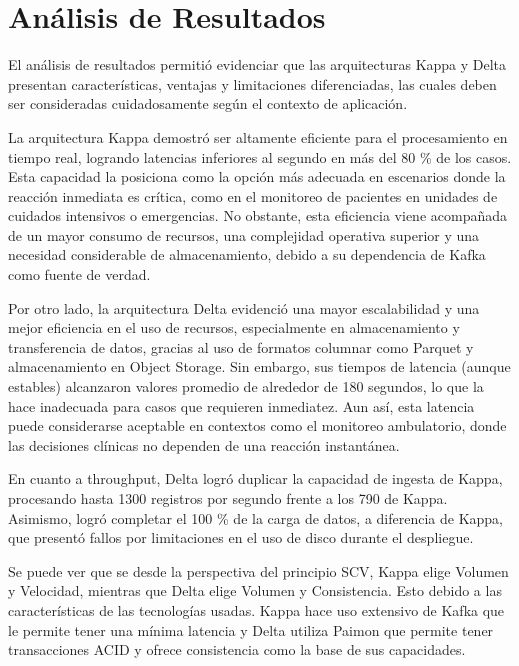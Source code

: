 \section{Análisis de Resultados}

El análisis de resultados permitió evidenciar que las arquitecturas Kappa y Delta presentan características, 
ventajas y limitaciones diferenciadas, las cuales deben ser consideradas cuidadosamente según el contexto de aplicación. \newline

La arquitectura Kappa demostró ser altamente eficiente para el procesamiento en tiempo real, logrando latencias inferiores al segundo en más del 80 \% de los casos. 
Esta capacidad la posiciona como la opción más adecuada en escenarios donde la reacción inmediata es crítica, 
como en el monitoreo de pacientes en unidades de cuidados intensivos o emergencias. 
No obstante, esta eficiencia viene acompañada de un mayor consumo de recursos, 
una complejidad operativa superior y una necesidad considerable de almacenamiento, 
debido a su dependencia de Kafka como fuente de verdad. \newline

Por otro lado, la arquitectura Delta evidenció una mayor escalabilidad y una mejor eficiencia en el uso de recursos, 
especialmente en almacenamiento y transferencia de datos, gracias al uso de formatos columnar como Parquet y almacenamiento en Object Storage. 
Sin embargo, sus tiempos de latencia (aunque estables) alcanzaron valores promedio de alrededor de 180 segundos, 
lo que la hace inadecuada para casos que requieren inmediatez. Aun así, esta latencia puede considerarse aceptable en contextos como el monitoreo ambulatorio, 
donde las decisiones clínicas no dependen de una reacción instantánea. \newline

En cuanto a throughput, Delta logró duplicar la capacidad de ingesta de Kappa, 
procesando hasta 1300 registros por segundo frente a los 790 de Kappa. 
Asimismo, logró completar el 100 \% de la carga de datos, a diferencia de Kappa, 
que presentó fallos por limitaciones en el uso de disco durante el despliegue. \newline

Se puede ver que se desde la perspectiva del principio SCV, Kappa elige Volumen y Velocidad,
mientras que Delta elige Volumen y Consistencia. Esto debido a las características de las tecnologías usadas. 
Kappa hace uso extensivo de Kafka que le permite tener una mínima latencia 
y Delta utiliza Paimon que permite tener transacciones ACID y ofrece consistencia como la base de sus capacidades.

